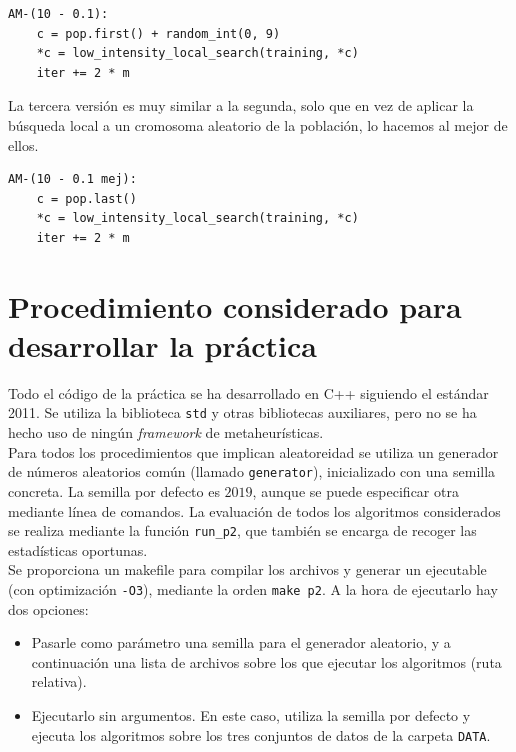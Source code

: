 \documentclass[12pt]{article}
\begin{document}
\begin{verbatim}
AM-(10 - 0.1):
    c = pop.first() + random_int(0, 9)
    *c = low_intensity_local_search(training, *c)
    iter += 2 * m
\end{verbatim}

La tercera versión es muy similar a la segunda, solo que en vez de aplicar la búsqueda local a un cromosoma aleatorio de la población, lo hacemos al mejor de ellos.

\begin{verbatim}
AM-(10 - 0.1 mej):
    c = pop.last()
    *c = low_intensity_local_search(training, *c)
    iter += 2 * m
\end{verbatim}

\newpage
\section{Procedimiento considerado para desarrollar la práctica}

Todo el código de la práctica se ha desarrollado en C++ siguiendo el estándar 2011. Se utiliza la biblioteca \verb|std| y otras bibliotecas auxiliares, pero no se ha hecho uso de ningún \textit{framework} de metaheurísticas.\\

Para todos los procedimientos que implican aleatoreidad se utiliza un generador de números aleatorios común (llamado \verb|generator|), inicializado con una semilla concreta. La semilla por defecto es $2019$, aunque se puede especificar otra mediante línea de comandos. La evaluación de todos los algoritmos considerados se realiza mediante la función \verb|run_p2|, que también se encarga de recoger las estadísticas oportunas.\\

Se proporciona un makefile para compilar los archivos y generar un ejecutable (con optimización \verb|-O3|), mediante la orden \verb|make p2|. A la hora de ejecutarlo hay dos opciones:

\begin{itemize}
    \item Pasarle como parámetro una semilla para el generador aleatorio, y a continuación una lista de archivos sobre los que ejecutar los algoritmos (ruta relativa).
    \item Ejecutarlo sin argumentos. En este caso, utiliza la semilla por defecto y ejecuta los algoritmos sobre los tres conjuntos de datos de la carpeta \verb|DATA|.
\end{itemize}
\end{document}
